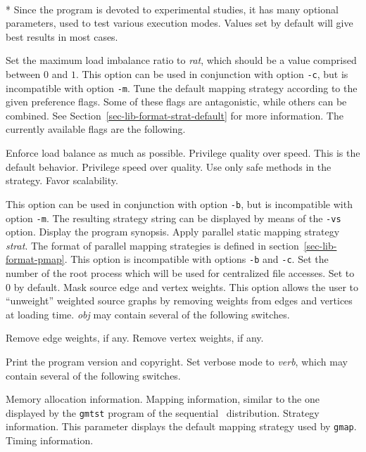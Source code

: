 \begin{itemize}
\progopt\\*
Since the program is devoted to experimental studies, it has many
optional parameters, used to test various execution modes. Values
set by default will give best results in most cases.
\begin{itemize}
\iteme[{\tt -b}{\it rat}]
Set the maximum load imbalance ratio to \textit{rat}, which should
be a value comprised between $0$ and $1$. This option can be used in
conjunction with option \texttt{-c}, but is incompatible with option
\texttt{-m}.
\iteme[{\tt -c}{\it flags}]
Tune the default mapping strategy according to the given preference
flags. Some of these flags are antagonistic, while others can be
combined. See Section~\ref{sec-lib-format-strat-default} for more
information. The currently available flags are the following.
\begin{itemize}
\iteme[{\tt b}]
Enforce load balance as much as possible.
\iteme[{\tt q}]
Privilege quality over speed. This is the default behavior.
\iteme[{\tt s}]
Privilege speed over quality.
\iteme[{\tt t}]
Use only safe methods in the strategy.
\iteme[{\tt x}]
Favor scalability.
\end{itemize}
This option can be used in conjunction with option \texttt{-b}, but is
incompatible with option \texttt{-m}.
The resulting strategy string can be displayed by means
of the {\tt -vs} option.
\iteme[{\tt -h}]
Display the program synopsis.
\iteme[{{\tt -m}{\it strat}}]
Apply parallel static mapping strategy {\it strat}. The format of parallel
mapping strategies is defined in section~\ref{sec-lib-format-pmap}.
This option is incompatible with options \texttt{-b} and
\texttt{-c}.
\iteme[{\tt -r}{\it num}]
Set the number of the root process which will be used for centralized
file accesses. Set to $0$ by default.
\iteme[{\tt -s}{\it obj}]
Mask source edge and vertex weights. This option allows the user to
``unweight'' weighted source graphs by removing weights from edges and
vertices at loading time. {\it obj\/} may contain several of the following
switches.
\begin{itemize}
\iteme[{\tt e}]
Remove edge weights, if any.
\iteme[{\tt v}]
Remove vertex weights, if any.
\end{itemize}
\iteme[{\tt -V}]
Print the program version and copyright.
\iteme[{\tt -v}{\it verb}]
Set verbose mode to {\it verb}, which may contain several of the following
switches.
\begin{itemize}
\iteme[{\tt a}]
Memory allocation information.
\iteme[{\tt m}]
Mapping information, similar to the one displayed by the {\tt gmtst}
program of the sequential \scotch\ distribution.
\iteme[{\tt s}]
Strategy information. This parameter displays the default mapping
strategy used by {\tt gmap}.
\iteme[{\tt t}]
Timing information.
\end{itemize}
\end{itemize}
\end{itemize}

